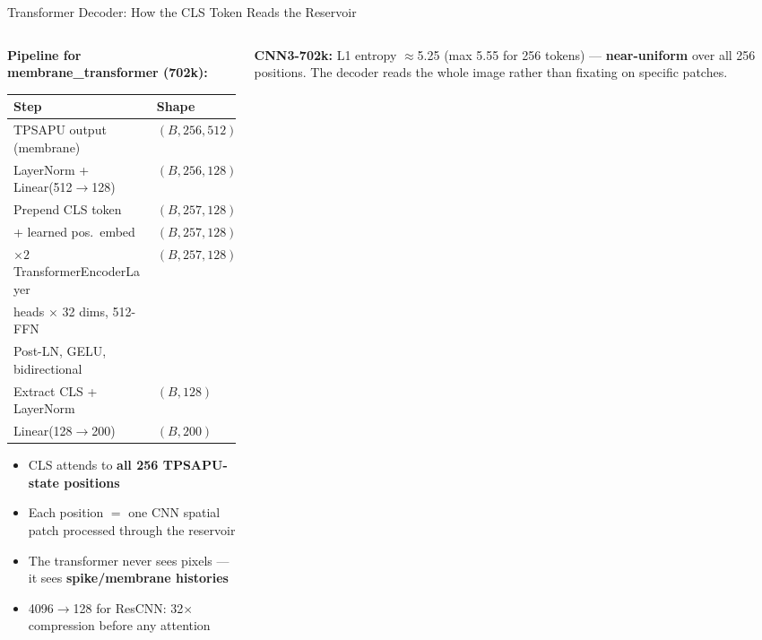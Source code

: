 \documentclass[aspectratio=169,11pt]{beamer}
\newcommand{\hl}[1]{{\color{highlight}\textbf{#1}}}
\begin{document}
\begin{frame}[shrink=5]{Transformer Decoder: How the CLS Token Reads the Reservoir}
\begin{columns}[T]
\begin{column}{0.50\textwidth}
  \textbf{Pipeline for membrane\_transformer (702k):}
  \vspace{0.3em}
  {\scriptsize
  \begin{tabular}{ll}
    \toprule
    Step & Shape \\
    \midrule
    TPSAPU output (membrane) & $(B,256,512)$ \\
    LayerNorm + Linear(512$\to$128) & $(B,256,128)$ \\
    Prepend CLS token & $(B,257,128)$ \\
    + learned pos.\ embed & $(B,257,128)$ \\
    $\times2$ TransformerEncoderLayer & $(B,257,128)$ \\
    \quad 4 heads $\times$ 32 dims, 512-FFN & \\
    \quad Post-LN, GELU, bidirectional & \\
    Extract CLS + LayerNorm & $(B,128)$ \\
    Linear(128$\to$200) & $(B,200)$ \\
    \bottomrule
  \end{tabular}}
  \vspace{0.3em}
  \begin{itemize}\small
    \item CLS attends to \hl{all 256 TPSAPU-state positions}
    \item Each position $= $ one CNN spatial patch processed through the reservoir
    \item The transformer never sees pixels — it sees \textbf{spike/membrane histories}
    \item 4096$\to$128 for ResCNN: 32$\times$ compression before any attention
  \end{itemize}
\end{column}
\begin{column}{0.46\textwidth}
  \begin{tcolorbox}[mybox,title=What does CLS pay attention to?]
    \scriptsize
    \textbf{CNN3-702k:} L1 entropy $\approx$5.25 (max 5.55 for 256 tokens) —
    \hl{near-uniform} over all 256 positions. The decoder reads the whole image
    rather than fixating on specific patches.\\[0.4em]

\end{tcolorbox}
\end{column}
\end{columns}
\end{frame}
\end{document}
